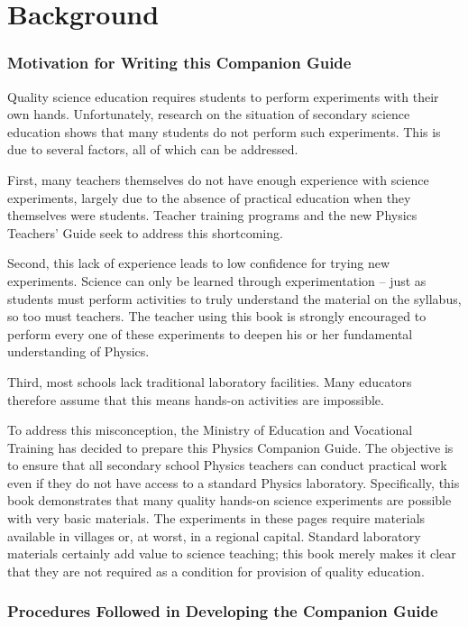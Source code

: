 \chapter*{Background}

\subsection*{Motivation for Writing this Companion Guide}

Quality science education requires students to perform experiments with their own hands. Unfortunately, research on the situation of secondary science education shows that many students do not perform such experiments. This is due to several factors, all of which can be addressed.

First, many teachers themselves do not have enough experience with science experiments, largely due to the absence of practical education when they themselves were students. Teacher training programs and the new Physics Teachers' Guide seek to address this shortcoming.

Second, this lack of experience leads to low confidence for trying new experiments. Science can only be learned through experimentation -- just as students must perform activities to truly understand the material on the syllabus, so too must teachers. The teacher using this book is strongly encouraged to perform every one of these experiments to deepen his or her fundamental understanding of Physics.

Third, most schools lack traditional laboratory facilities. Many educators therefore assume that this means hands-on activities are impossible.

To address this misconception, the Ministry of Education and Vocational Training has decided to prepare this Physics Companion Guide. The objective is to ensure that all secondary school Physics teachers can conduct practical work even if they do not have access to a standard Physics laboratory. Specifically, this book demonstrates that many quality hands-on science experiments are possible with very basic materials. The experiments in these pages require materials available in villages or, at worst, in a regional capital. Standard laboratory materials certainly add value to science teaching; this book merely makes it clear that they are not required as a condition for provision of quality education.

\subsection*{Procedures Followed in Developing the Companion Guide}

